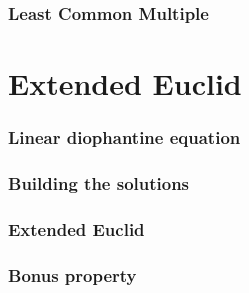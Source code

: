 \documentclass[12pt]{beamer}
\begin{document}
\begin{frame}
\frametitle{Least Common Multiple}
\end{frame}

\section{Extended Euclid}

\begin{frame}
\frametitle{Linear diophantine equation}
\end{frame}

\begin{frame}
\frametitle{Building the solutions}
\end{frame}

\begin{frame}
\frametitle{Extended Euclid}
\end{frame}

\begin{frame}
\frametitle{Bonus property}
\end{frame}
\end{document}
